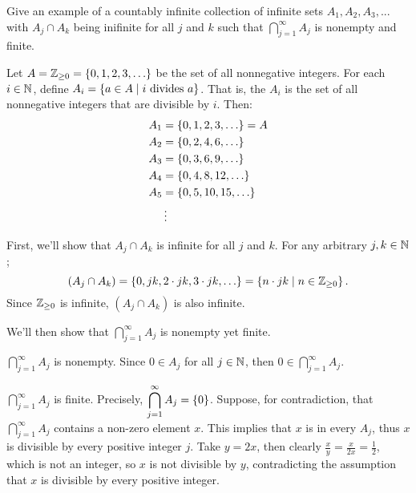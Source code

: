 \begin{problem}
  Give an example of a countably infinite collection of infinite sets
  $A_1, A_2, A_3, ...$ with $A_j \cap A_k$ being inifinite for all
  $j$ and $k$ such that $\displaystyle \bigcap_{j=1}^\infty A_j$ is nonempty
  and finite.
\end{problem}
\begin{answer}
  Let $A = \mathbb{Z}_{\geq 0} = \left\{0, 1, 2, 3, \ldots\right\}$ be the set of all nonnegative integers.
  For each $i \in \mathbb{N}$, define $A_i = \left\{a \in A \mid i \text{ divides } a\right\}$.
  That is, the $A_i$ is the set of all nonnegative integers that are divisible by $i$. 
  Then:
  \begin{align*}
    A_1 &= \left\{0, 1, 2, 3, \ldots\right\} = A \\
    A_2 &= \left\{0, 2, 4, 6, \ldots\right\} \\
    A_3 &= \left\{0, 3, 6, 9, \ldots\right\} \\
    A_4 &= \left\{0, 4, 8, 12, \ldots\right\} \\
    A_5 &= \left\{0, 5, 10, 15, \ldots\right\} \\
    &\vdots
  \end{align*}
  \begin{enumroman}
    \item First, we'll show that $A_j \cap A_k$ is infinite for all $j$ and $k$.
      For any arbitrary $j, k \in \mathbb{N}$;
      \[
        (A_j \cap A_k) = \left\{0, jk , 2 \cdot jk, 3 \cdot jk, \ldots\right\} = \left\{ n \cdot jk \mid n \in \mathbb{Z}_{\geq 0}\right\}.
      \]
      Since $\mathbb{Z}_{\geq 0}$ is infinite, $(A_j \cap A_k)$ is also infinite. \\
    \item We'll then show that $\displaystyle \bigcap_{j=1}^\infty A_j$ is nonempty yet finite.
      \begin{enumarabic}
        \item $\displaystyle \bigcap_{j=1}^\infty A_j$ is nonempty.
          Since $0 \in A_j$ for all $j \in \mathbb{N}$, then $0 \in \displaystyle \bigcap_{j=1}^\infty A_j$. \\
        \item $\displaystyle \bigcap_{j=1}^\infty A_j$ is finite.
          Precisely, $\displaystyle \bigcap_{j=1}^\infty A_j = \left\{0\right\}$.
          Suppose, for contradiction, that $\displaystyle \bigcap_{j=1}^\infty A_j$
          contains a non-zero element $x$.
          This implies that $x$ is in every $A_j$, thus $x$ is divisible by every positive integer $j$.
          Take $y = 2x$, then clearly $\displaystyle \frac{x}{y} = \frac{x}{2x} = \frac{1}{2}$,
          which is not an integer, so $x$ is not divisible by $y$,
          contradicting the assumption that $x$ is divisible by every positive integer.
      \end{enumarabic}    
  \end{enumroman}
\end{answer}
